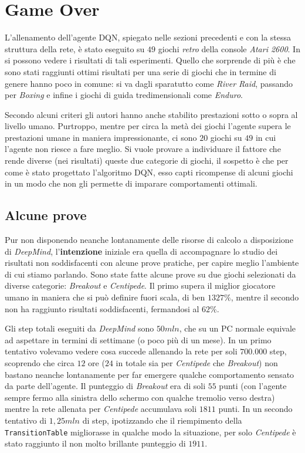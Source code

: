 \documentclass[twoside,twocolumn,10pt]{extarticle}
\theoremstyle{definition}
\begin{document}
\section{Game Over}\label{}
	L'allenamento dell'agente DQN, spiegato nelle sezioni precedenti e con la stessa struttura della rete, è stato eseguito su $49$ giochi \textit{retro} della console \textit{Atari 2600}. In \cite{bib:dqn} si possono vedere i risultati di tali esperimenti. Quello che sorprende di più è che sono stati raggiunti ottimi risultati per una serie di giochi che in termine di genere hanno poco in comune: si va dagli sparatutto come \textit{River Raid}, passando per \textit{Boxing} e infine i giochi di guida tredimensionali come \textit{Enduro}.
	
	Secondo alcuni criteri gli autori hanno anche stabilito prestazioni sotto o sopra al livello umano. Purtroppo, mentre per circa la metà dei giochi l'agente supera le prestazioni umane in maniera impressionante, ci sono $20$ giochi su $49$ in cui l'agente non riesce a fare meglio. Si vuole provare a individuare il fattore che rende diverse (nei risultati) queste due categorie di giochi, il sospetto è che per come è stato progettato l'algoritmo DQN, esso capti ricompense di alcuni giochi in un modo che non gli permette di imparare comportamenti ottimali.
	
	\subsection{Alcune prove}
		Pur non disponendo neanche lontanamente delle risorse di calcolo a disposizione di \textit{DeepMind}, l'\textbf{intenzione} iniziale era quella di accompagnare lo studio dei risultati non soddisfacenti con alcune prove pratiche, per capire meglio l'ambiente di cui stiamo parlando. Sono state fatte alcune prove su due giochi selezionati da diverse categorie: \textit{Breakout} e \textit{Centipede}. Il primo supera il miglior giocatore umano in maniera che si può definire fuori scala, di ben $1327\%$, mentre il secondo non ha raggiunto risultati soddisfacenti, fermandosi al $62\%$.
		
		Gli step totali eseguiti da \textit{DeepMind} sono $50mln$, che su un PC normale equivale ad aspettare in termini di settimane (o poco più di un mese). In un primo tentativo volevamo vedere cosa succede allenando la rete per soli $700.000$ step, scoprendo che circa $12$ ore ($24$ in totale sia per \textit{Centipede} che \textit{Breakout}) non bastano neanche lontanamente per far emergere qualche comportamento sensato da parte dell'agente. Il punteggio di \textit{Breakout} era di soli $55$ punti (con l'agente sempre fermo alla sinistra dello schermo con qualche tremolio verso destra) mentre la rete allenata per \textit{Centipede} accumulava soli $1811$ punti. In un secondo tentativo di $1,25mln$ di step, ipotizzando che il riempimento della \texttt{TransitionTable} migliorasse in qualche modo la situazione, per solo \textit{Centipede} è stato raggiunto il non molto brillante punteggio di $1911$.
		
\end{document}
